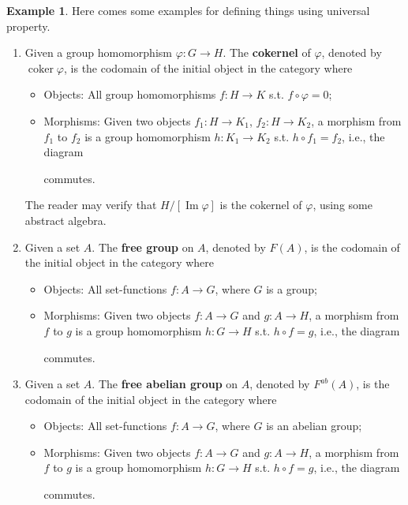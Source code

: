 \documentclass{article}
\theoremstyle{definition}
\theoremstyle{definition}
\newtheorem{example}{Example}[section]
\theoremstyle{remark}
\DeclareMathOperator{\Ima}{Im}
\DeclareMathOperator{\coker}{coker}
\begin{document}
\begin{example}Here comes some examples for defining things using universal property.
	\begin{enumerate}[label=(\roman*)]
		\item Given a group homomorphism $\varphi:G\to H$. The \textbf{cokernel} of $\varphi$, denoted by $\coker \varphi$, is the codomain of the initial object in the category where
			\begin{itemize}
				\item Objects: All group homomorphisms $f:H\to K$ s.t. $f\circ \varphi=0$;
				\item Morphisms: Given two objects $f_1:H\to K_1$, $f_2:H\to K_2$, a morphism from $f_1$ to $f_2$ is a group homomorphism $h:K_1\to K_2$ s.t. $h\circ f_1=f_2$, i.e., the diagram 
			commutes.
			\end{itemize}
		The reader may verify that $H/[\Ima\varphi]$ is the cokernel of $\varphi$, using some abstract algebra. 
		\item Given a set $A$. The \textbf{free group} on $A$, denoted by $F(A)$, is the codomain of the initial object in the category where
			\begin{itemize}
				\item Objects: All set-functions $f:A\to G$, where $G$ is a group;
				\item Morphisms: Given two objects $f:A\to G$ and $g:A\to H$, a morphism from $f$ to $g$ is a group homomorphism $h:G\to H$ s.t. $h\circ f=g$, i.e., the diagram
				commutes.
			\end{itemize}
		\item Given a set $A$. The \textbf{free abelian group} on $A$, denoted by $F^{ab}(A)$, is the codomain of the initial object in the category where
			\begin{itemize}
				\item Objects: All set-functions $f:A\to G$, where $G$ is an abelian group;
				\item Morphisms: Given two objects $f:A\to G$ and $g:A\to H$, a morphism from $f$ to $g$ is a group homomorphism $h:G\to H$ s.t. $h\circ f=g$, i.e., the diagram
				commutes.
			\end{itemize}


\end{enumerate}
\end{example}
\end{document}
